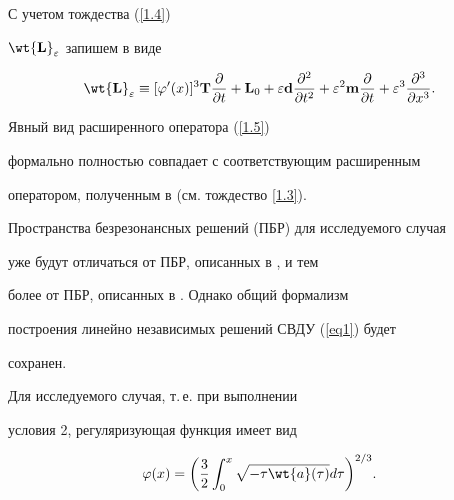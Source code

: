 С учетом тождества (\ref{1.4}) 


$\wt{\bold{L}}_{\varepsilon}$ запишем в виде


\begin{equation}


\label{1.5}


\wt{\bold{L}}_{\varepsilon} \equiv [\varphi'


(x)]^3 \bold{T}\frac{\partial}{\partial t} + \bold{L}_0 +


\varepsilon \bold{d} \frac{\partial^2}{\partial t^2 } +


\varepsilon^2 \bold{m} \frac{\partial}{\partial t} +


\varepsilon^3 \frac{\partial^3}{\partial x^3}.


\end{equation}








\begin{note}


Явный вид расширенного оператора (\ref{1.5})


формально полностью совпадает с соответствующим расширенным


оператором, полученным в \cite{Bobochko2} (см. тождество \eqref{1.3}).


Пространства безрезонансных решений (ПБР) для исследуемого случая


уже будут отличаться от ПБР, описанных в \cite{Bobochko2}, и тем


более от ПБР, описанных в \cite{Bobochko1}. Однако общий формализм


построения линейно независимых решений СВДУ (\ref{eq1}) будет


сохранен.


\end{note}





Для исследуемого случая, т.\,е. при выполнении


условия 2, регуляризующая функция имеет вид


$$


\varphi(x) = \bigg(


{\frac{{3}}{{2}}\int_{0}^{x} {\sqrt {-\tau


\wt{a}({\tau})}d\tau} } \bigg)^{2/3}.


$$





